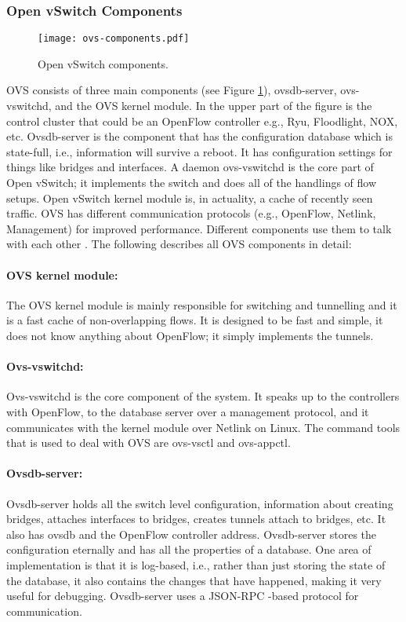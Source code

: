 \subsubsection{Open vSwitch Components}

\begin{figure}[H]
\begin{center}
	\resizebox{\textwidth}{!}
	{\texttt{[image: ovs-components.pdf]}}
	\caption{Open vSwitch components.}
	\label{fig:ovscomponent}
\end{center}
\end{figure}

OVS consists of three main components (see Figure \ref{fig:ovscomponent}), ovsdb-server, ovs-vswitchd, and the OVS kernel module. In the upper part of the figure is the control cluster that could be an OpenFlow controller e.g., Ryu, Floodlight, NOX, etc. Ovsdb-server is the component that has the configuration database which is state-full, i.e., information will survive a reboot. It has configuration settings for things like bridges and interfaces. A daemon ovs-vswitchd is the core part of Open vSwitch; it implements the switch and does all of the handlings of flow setups. Open vSwitch kernel module is, in actuality, a cache of recently seen traffic. OVS has different communication protocols (e.g., OpenFlow, Netlink, Management) for improved performance. Different components use them to talk with each other \cite{Pfaff:2015:DIO:2789770.2789779}. The following describes all OVS components in detail:

\paragraph{OVS kernel module:}
The OVS kernel module is mainly responsible for switching and tunnelling and it is a fast cache of non-overlapping flows. It is designed to be fast and simple, it does not know anything about OpenFlow; it simply implements the tunnels.

\paragraph{Ovs-vswitchd:}
Ovs-vswitchd is the core component of the system. It speaks up to the controllers with OpenFlow, to the database server over a management protocol, and it communicates with the kernel module over Netlink on Linux. The command tools that is used to deal with OVS are ovs-vsctl and ovs-appctl.

\paragraph{Ovsdb-server:}
Ovsdb-server holds all the switch level configuration, information about creating bridges, attaches interfaces to bridges, creates tunnels attach to bridges, etc. It also has ovsdb and the OpenFlow controller address. Ovsdb-server stores the configuration eternally and has all the properties of a database. One area of implementation is that it is log-based, i.e., rather than just storing the state of the database, it also contains the changes that have happened, making it very useful for debugging. Ovsdb-server uses a JSON-RPC \cite{jsonrpc}-based protocol for communication.

